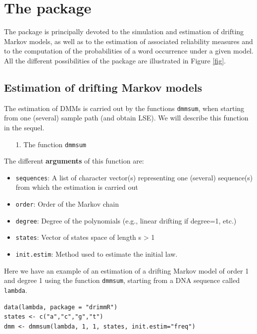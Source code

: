 \documentclass[article,nojss]{jss}\usepackage[]{graphicx}\usepackage[]{color}
\begin{document}
\section{The  package} \label{section_package}

The  package is principally devoted to the simulation and estimation of drifting Markov models, as well as to the estimation of associated  reliability measures and to the computation of the  probabilities of a word occurrence under a given model. All the different possibilities of the package are illustrated in Figure \ref{fig}.

\subsection{Estimation of drifting Markov models} \label{subsection_pack_estim}

The estimation of DMMs is carried out by the functions \verb|dmmsum|, when starting from one (several) sample path (and obtain LSE). We will describe this function in the sequel.

\begin{enumerate}
	\item[1.] The function \verb|dmmsum|
\end{enumerate}

The different {\bf arguments} of this function are:
%
\begin{itemize}
\item {\tt sequences}: A list of character vector(s) representing one (several) sequence(s) from which the estimation is carried out
\item {\tt order}:  Order of the Markov chain
\item {\tt degree}: Degree of the polynomials (e.g., linear drifting if degree=1, etc.)
\item {\tt states}: Vector of states space of length s > 1
\item {\tt init.estim}: Method used to estimate the initial law.

\end{itemize}

Here we have an example of an estimation of a drifting Markov model of order 1 and degree 1 using the function \verb|dmmsum|, starting from a DNA sequence called {\tt lambda}.

\begin{lstlisting}
data(lambda, package = "drimmR")
states <- c("a","c","g","t")
dmm <- dmmsum(lambda, 1, 1, states, init.estim="freq")
\end{lstlisting}
\end{document}
